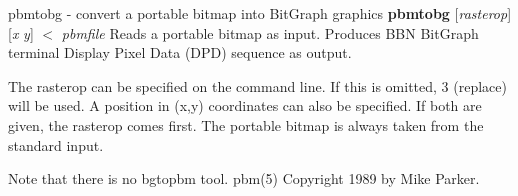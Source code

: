 %

\newpage
%

pbmtobg - convert a portable bitmap into BitGraph graphics
{\bf pbmtobg}
{\rm [}{\it rasterop}{\rm ]}
{\rm [}{\it x}
{\it y}{\rm ]}
$<$
{\it pbmfile}
Reads a portable bitmap as input.
Produces BBN BitGraph terminal Display Pixel Data (DPD) sequence as output.
\par
The rasterop can be specified on the command line.  If this is omitted, 3
(replace) will be used.  A position in (x,y) coordinates can also be
specified.  If both are given, the rasterop comes first.  The portable bitmap
is always taken from the standard input.
\par
Note that there is no bgtopbm tool.
pbm(5)
Copyright 1989 by Mike Parker.
%
 
%

\newpage
%

